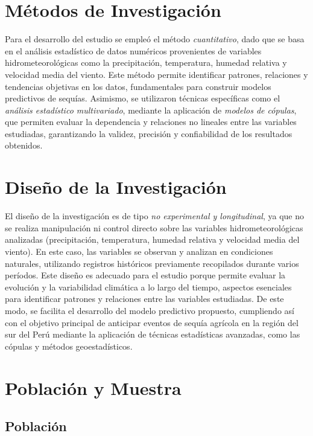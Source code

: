 \section{Métodos de Investigación}
Para el desarrollo del estudio se empleó el método \textit{cuantitativo}, dado que se basa en el análisis estadístico de datos numéricos provenientes de variables hidrometeorológicas como la precipitación, temperatura, humedad relativa y velocidad media del viento. Este método permite identificar patrones, relaciones y tendencias objetivas en los datos, fundamentales para construir modelos predictivos de sequías. Asimismo, se utilizaron técnicas específicas como el \textit{análisis estadístico multivariado}, mediante la aplicación de \textit{modelos de cópulas}, que permiten evaluar la dependencia y relaciones no lineales entre las variables estudiadas, garantizando la validez, precisión y confiabilidad de los resultados obtenidos.

\section{Diseño de la Investigación}

El diseño de la investigación es de tipo \textit{no experimental y longitudinal}, ya que no se realiza manipulación ni control directo sobre las variables hidrometeorológicas analizadas (precipitación, temperatura, humedad relativa y velocidad media del viento). En este caso, las variables se observan y analizan en condiciones naturales, utilizando registros históricos previamente recopilados durante varios períodos. Este diseño es adecuado para el estudio porque permite evaluar la evolución y la variabilidad climática a lo largo del tiempo, aspectos esenciales para identificar patrones y relaciones entre las variables estudiadas. De este modo, se facilita el desarrollo del modelo predictivo propuesto, cumpliendo así con el objetivo principal de anticipar eventos de sequía agrícola en la región del sur del Perú mediante la aplicación de técnicas estadísticas avanzadas, como las cópulas y métodos geoestadísticos.

\section{Población y Muestra}

\subsection{Población}

